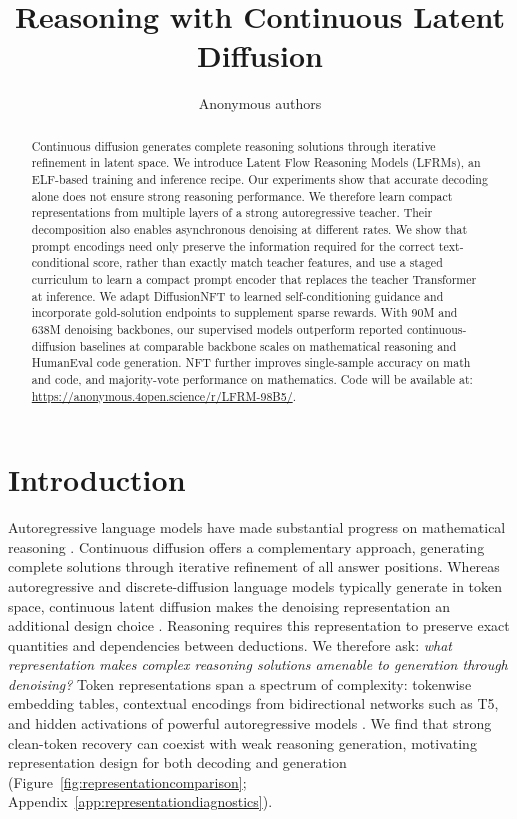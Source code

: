 \documentclass{article}
\title{Reasoning with Continuous Latent Diffusion}
\author{Anonymous authors}
\begin{document}
\maketitle

\begin{abstract}
Continuous diffusion generates complete reasoning solutions through iterative refinement in latent space. We introduce Latent Flow Reasoning Models (LFRMs), an ELF-based training and inference recipe. Our experiments show that accurate decoding alone does not ensure strong reasoning performance. We therefore learn compact representations from multiple layers of a strong autoregressive teacher. Their decomposition also enables asynchronous denoising at different rates. We show that prompt encodings need only preserve the information required for the correct text-conditional score, rather than exactly match teacher features, and use a staged curriculum to learn a compact prompt encoder that replaces the teacher Transformer at inference. We adapt DiffusionNFT to learned self-conditioning guidance and incorporate gold-solution endpoints to supplement sparse rewards. With 90M and 638M denoising backbones, our supervised models outperform reported continuous-diffusion baselines at comparable backbone scales on mathematical reasoning and HumanEval code generation. NFT further improves single-sample accuracy on math and code, and majority-vote performance on mathematics.
Code will be available at: \url{https://anonymous.4open.science/r/LFRM-98B5/}.
\end{abstract}
\setlength{\parskip}{4pt}

\section{Introduction}
\label{sec:introduction}

Autoregressive language models have made substantial progress on mathematical reasoning \citep{minerva,deepseekr1}. Continuous diffusion offers a complementary approach, generating complete solutions through iterative refinement of all answer positions. Whereas autoregressive and discrete-diffusion language models typically generate in token space, continuous latent diffusion makes the denoising representation an additional design choice \citep{elf,llada}. Reasoning requires this representation to preserve exact quantities and dependencies between deductions. We therefore ask: \emph{what representation makes complex reasoning solutions amenable to generation through denoising?} Token representations span a spectrum of complexity: tokenwise embedding tables, contextual encodings from bidirectional networks such as T5, and hidden activations of powerful autoregressive models \citep{plaid,t5,qwen3}. We find that strong clean-token recovery can coexist with weak reasoning generation, motivating representation design for both decoding and generation (Figure~\ref{fig:representationcomparison}; Appendix~\ref{app:representationdiagnostics}).
\end{document}

